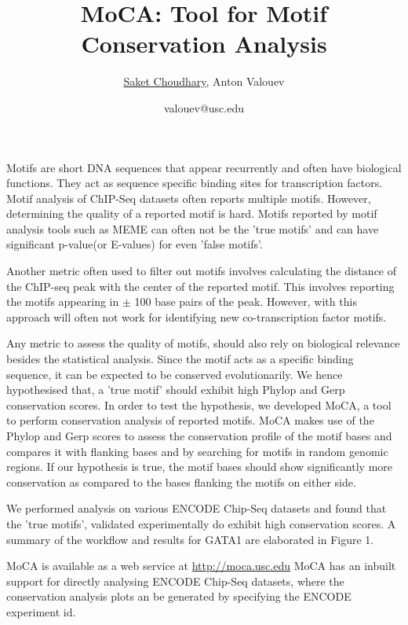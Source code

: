 \documentclass[16pt,a4paper]{article}
\title{\textbf{MoCA: Tool for Motif Conservation Analysis}}
\author{\underline{Saket Choudhary}, Anton Valouev}
\date{valouev@usc.edu}
\begin{document}
\maketitle
Motifs are short DNA sequences that appear recurrently and often have biological functions. They act as sequence specific binding sites for transcription factors. Motif analysis of ChIP-Seq datasets often reports multiple motifs. However, determining the quality of a reported motif is hard. Motifs reported by motif analysis tools such as MEME\cite{bailey2015meme} can often not be the 'true motifs' and  can have significant p-value(or E-values) for even 'false motifs'. 


Another metric often used to filter out motifs involves calculating the distance of the ChIP-seq peak with the center of the reported motif. This involves reporting the motifs appearing in $\pm$ 100 base pairs of the peak. 
However, with this approach will often not work for
identifying new co-transcription factor motifs.


Any metric to assess the quality of motifs, should also rely on biological relevance besides the statistical analysis. 
Since the motif acts as a specific binding sequence, it can be expected to be conserved evolutionarily. We hence hypothesised that, a 'true motif' should exhibit high Phylop\cite{siepel2006new} and Gerp\cite{davydov2010identifying} conservation scores.
In order to test the hypothesis, we developed MoCA, a tool to perform conservation analysis of reported motifs. MoCA makes use of the Phylop and Gerp scores to assess the conservation profile of the motif bases and compares it with flanking bases and by searching for motifs in random genomic regions. If our hypothesis is true, the motif bases should show significantly more conservation as compared to the bases flanking the motifs on either side. 

We performed analysis on various ENCODE Chip-Seq datasets and found that the 'true motifs', validated experimentally do exhibit high conservation scores. A summary of the workflow and results for GATA1 are elaborated in Figure 1.

MoCA is available as a web service at \url{http://moca.usc.edu}
MoCA has an inbuilt support for directly analysing ENCODE Chip-Seq datasets, where the conservation analysis plots an be generated by specifying the ENCODE experiment id. 


\end{document}
